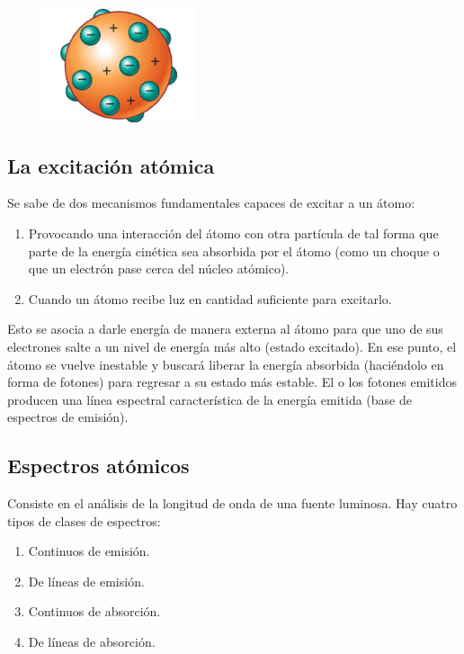 \documentclass[a4paper]{article}
\begin{document}
        \begin{figure}[h!]
            \centering
            \includegraphics[width=4.5cm]{../imagenes/modeloAtomicoThomson.jpeg}
        \end{figure}

    \subsection{La excitación atómica}
        \indent Se sabe de dos mecanismos fundamentales capaces de excitar a un átomo:

        \renewcommand{\theenumi}{\roman{enumi}}
        \begin{enumerate}
            \item Provocando una interacción del átomo con otra partícula de tal forma que parte de la energía cinética sea absorbida por el átomo (como un choque o que un electrón pase cerca del núcleo atómico).
            \item Cuando un átomo recibe luz en cantidad suficiente para excitarlo.
        \end{enumerate}

        \indent Esto se asocia a darle energía de manera externa al átomo para que uno de sus electrones salte a un nivel de energía más alto (estado excitado). En ese punto, el átomo se vuelve inestable y buscará liberar la energía absorbida (haciéndolo en forma de fotones) para regresar a su estado más estable.
        \indent El o los fotones emitidos producen una línea espectral característica de la energía emitida (base de espectros de emisión).

    \subsection{Espectros atómicos}
        \indent Consiste en el análisis de la longitud de onda de una fuente luminosa. Hay cuatro tipos de clases de espectros:
        \begin{enumerate}
            \item Continuos de emisión.
            \item De líneas de emisión.
            \item Continuos de absorción.
            \item De líneas de absorción.
        \end{enumerate}
\end{document}
